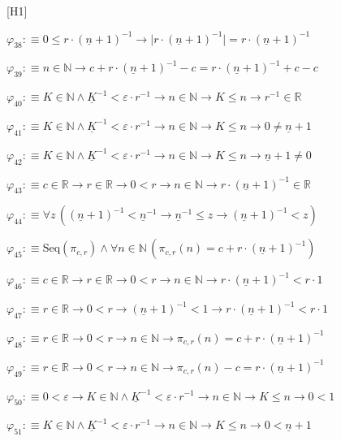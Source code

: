 \begin{fullproof}{[H1]}
\begin{abbrevlist}
\item $\varphi_{38} :\equiv 0 \leq r \cdot (\underline{n} + 1)^{-1} \to \lvert r \cdot (\underline{n} + 1)^{-1} \rvert = r \cdot (\underline{n} + 1)^{-1}$
\item $\varphi_{39} :\equiv n \in \mathbb{N} \to c + r \cdot (\underline{n} + 1)^{-1} - c = r \cdot (\underline{n} + 1)^{-1} + c - c$
\item $\varphi_{40} :\equiv K \in \mathbb{N} \land \underline{K}^{-1} < \varepsilon \cdot r^{-1} \to n \in \mathbb{N} \to K \leq n \to r^{-1} \in \mathbb{R}$
\item $\varphi_{41} :\equiv K \in \mathbb{N} \land \underline{K}^{-1} < \varepsilon \cdot r^{-1} \to n \in \mathbb{N} \to K \leq n \to 0 \neq \underline{n} + 1$
\item $\varphi_{42} :\equiv K \in \mathbb{N} \land \underline{K}^{-1} < \varepsilon \cdot r^{-1} \to n \in \mathbb{N} \to K \leq n \to \underline{n} + 1 \neq 0$
\item $\varphi_{43} :\equiv c \in \mathbb{R} \to r \in \mathbb{R} \to 0 < r \to n \in \mathbb{N} \to r \cdot (\underline{n} + 1)^{-1} \in \mathbb{R}$
\item $\varphi_{44} :\equiv \forall z\,((\underline{n} + 1)^{-1} < \underline{n}^{-1} \to \underline{n}^{-1} \leq z \to (\underline{n} + 1)^{-1} < z)$
\item $\varphi_{45} :\equiv \mathrm{Seq}(\pi_{c,r}) \land \forall n \in \mathbb{N}\,(\pi_{c,r}(n) = c + r \cdot (\underline{n} + 1)^{-1})$
\item $\varphi_{46} :\equiv c \in \mathbb{R} \to r \in \mathbb{R} \to 0 < r \to n \in \mathbb{N} \to r \cdot (\underline{n} + 1)^{-1} < r \cdot 1$
\item $\varphi_{47} :\equiv r \in \mathbb{R} \to 0 < r \to (\underline{n} + 1)^{-1} < 1 \to r \cdot (\underline{n} + 1)^{-1} < r \cdot 1$
\item $\varphi_{48} :\equiv r \in \mathbb{R} \to 0 < r \to n \in \mathbb{N} \to \pi_{c,r}(n) = c + r \cdot (\underline{n} + 1)^{-1}$
\item $\varphi_{49} :\equiv r \in \mathbb{R} \to 0 < r \to n \in \mathbb{N} \to \pi_{c,r}(n) - c = r \cdot (\underline{n} + 1)^{-1}$
\item $\varphi_{50} :\equiv 0 < \varepsilon \to K \in \mathbb{N} \land \underline{K}^{-1} < \varepsilon \cdot r^{-1} \to n \in \mathbb{N} \to K \leq n \to 0 < 1$
\item $\varphi_{51} :\equiv K \in \mathbb{N} \land \underline{K}^{-1} < \varepsilon \cdot r^{-1} \to n \in \mathbb{N} \to K \leq n \to 0 < \underline{n} + 1$

\end{abbrevlist}
\end{fullproof}
